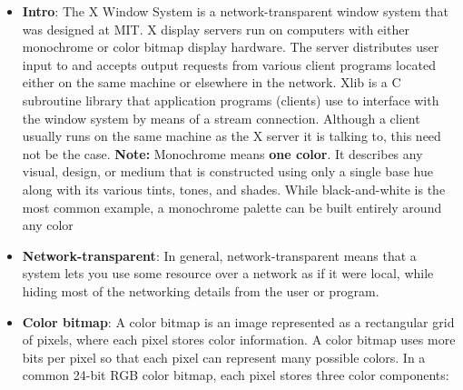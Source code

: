 \documentclass{report}
\begin{document}
\begin{itemize}
            \bigbreak \noindent 
            A windowing system is broader. It is the architecture that defines how graphical applications, windows, input, drawing, and the display server/compositor interact.
            \bigbreak \noindent 
            It includes concepts such as:
            \begin{itemize}
                \item windows;
                \item graphical clients;
                \item input events;
                \item drawing surfaces;
                \item focus;
                \item stacking order;
                \item protocols for communication between apps and the graphical environment.
            \end{itemize}
        \item \textbf{Intro}: The X Window System is a network-transparent window system that was designed at MIT. X display servers run on computers with either monochrome or color bitmap display hardware. The server distributes user input to and accepts output requests from various client programs located either on the same machine or elsewhere in the network. Xlib is a C subroutine library that application programs (clients) use to interface with the window system by means of a stream connection. Although a client usually runs on the same machine as the X server it is talking to, this need not be the case. 
            \bigbreak \noindent 
            \textbf{Note:} Monochrome means \textbf{one color}. It describes any visual, design, or medium that is constructed using only a single base hue along with its various tints, tones, and shades. While black-and-white is the most common example, a monochrome palette can be built entirely around any color
        \item \textbf{Network-transparent}: In general, network-transparent means that a system lets you use some resource over a network as if it were local, while hiding most of the networking details from the user or program.
        \item \textbf{Color bitmap}: A color bitmap is an image represented as a rectangular grid of pixels, where each pixel stores color information. A color bitmap uses more bits per pixel so that each pixel can represent many possible colors. In a common 24-bit RGB color bitmap, each pixel stores three color components:

\end{itemize}
\end{document}
